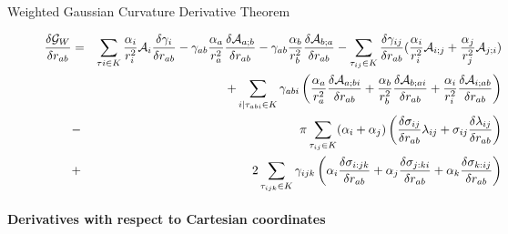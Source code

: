 \documentclass[11 pt]{article}
\newcommand {\mm}[1] {\ifmmode{#1}\else{\mbox{\(#1\)}}\fi}
\theoremstyle{plain} \theorembodyfont{\rmfamily}
\newcommand{\tsx}           {\mm{\tau}}
\begin{document}
\begin{description}
  \item[{\sc Weighted Gaussian Curvature Derivative Theorem}]
    \begin{eqnarray}
    \frac{\delta \mathcal{G}_W}{\delta r_{ab}}  &=&\sum_{\tsx{i} \in K} \frac{\alpha_i}{r_i^2} \mathcal{A}_i \frac{\delta \gamma_i}{\delta r_{ab}}   - \gamma_{ab} \frac{\alpha_a}{r_a^2} \frac{\delta\mathcal{A}_{a;b}}{\delta r_{ab}} - \gamma_{ab} \frac{\alpha_b}{r_b^2} \frac{\delta \mathcal{A}_{b;a}}{\delta r_{ab}}  
    - \sum_{ \tsx_{ij} \in K} \frac{\delta \gamma_{ij}}{\delta  r_{ab}}  (\frac{\alpha_i}{r_i^2} \mathcal{A}_{i;j} + \frac{\alpha_j}{r_j^2} \mathcal{A}_{j;i}) \nonumber \\
  &&  + \sum_{i \mid \tsx_{abi} \in K} \gamma_{abi} \left(\frac{\alpha_a}{r_a^2} \frac{\delta \mathcal{A}_{a;bi}}{\delta r_{ab}} + \frac{\alpha_b}{r_b^2} \frac{\delta \mathcal{A}_{b;ai}}{\delta r_{ab}}+\frac{\alpha_i}{r_i^2}\frac{\delta \mathcal{A}_{i;ab}}{\delta r_{ab}} \right) \nonumber \\
  &-&  \pi \sum_{\tsx_{ij} \in K} (\alpha_i+\alpha_j) \left(\frac{\delta \sigma_{ij}}{\delta r_{ab}} \lambda_{ij}  +  \sigma_{ij}  \frac{\delta \lambda_{ij}} {\delta r_{ab}}\right) \nonumber \\
  &+& 2 \sum_{\tsx_{ijk} \in K} \gamma_{ijk} \left (\alpha_i \frac{\delta \sigma_{i:jk}}{\delta r_{ab}} + \alpha_j \frac{\delta \sigma_{j:ki}}{\delta r_{ab}} + \alpha_k \frac{\delta \sigma_{k: ij}}{\delta r_{ab}} \right) \nonumber \\
          \label{eqn:gaussderiv}
          \end{eqnarray}
\end{description}

 
 \paragraph{Derivatives with respect to Cartesian coordinates}
  
\end{document}
